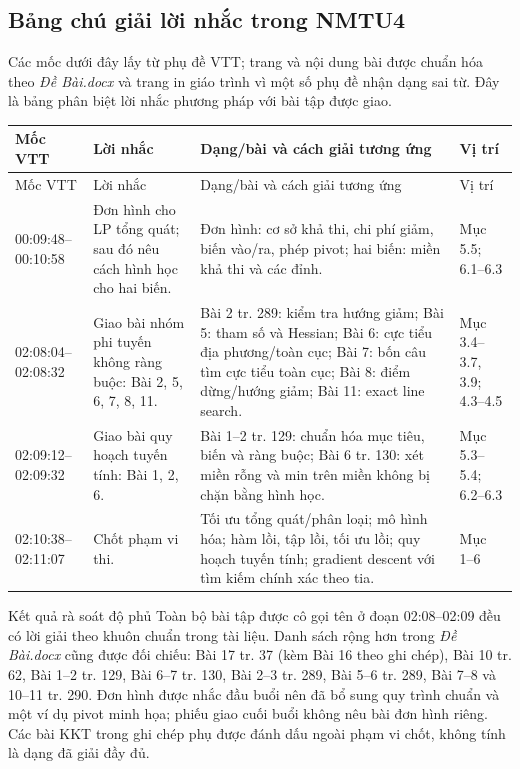 \documentclass[11pt,a4paper]{article}
\begin{document}
\subsection*{Bảng chú giải lời nhắc trong NMTU4}
Các mốc dưới đây lấy từ phụ đề VTT; trang và nội dung bài được chuẩn hóa theo \textit{Đề Bài.docx} và trang in giáo trình vì một số phụ đề nhận dạng sai từ. Đây là bảng phân biệt lời nhắc phương pháp với bài tập được giao.
\begingroup
\small
\begin{longtable}{p{} p{} p{} p{}}
\toprule
Mốc VTT & Lời nhắc & Dạng/bài và cách giải tương ứng & Vị trí\\
\midrule
\endfirsthead
\toprule
Mốc VTT & Lời nhắc & Dạng/bài và cách giải tương ứng & Vị trí\\
\midrule
\endhead
00:09:48--00:10:58 & Đơn hình cho LP tổng quát; sau đó nêu cách hình học cho hai biến. & Đơn hình: cơ sở khả thi, chi phí giảm, biến vào/ra, phép pivot; hai biến: miền khả thi và các đỉnh. & Mục 5.5; 6.1--6.3\\
02:08:04--02:08:32 & Giao bài nhóm phi tuyến không ràng buộc: Bài 2, 5, 6, 7, 8, 11. & Bài 2 tr. 289: kiểm tra hướng giảm; Bài 5: tham số và Hessian; Bài 6: cực tiểu địa phương/toàn cục; Bài 7: bốn câu tìm cực tiểu toàn cục; Bài 8: điểm dừng/hướng giảm; Bài 11: exact line search. & Mục 3.4--3.7, 3.9; 4.3--4.5\\
02:09:12--02:09:32 & Giao bài quy hoạch tuyến tính: Bài 1, 2, 6. & Bài 1--2 tr. 129: chuẩn hóa mục tiêu, biến và ràng buộc; Bài 6 tr. 130: xét miền rỗng và min trên miền không bị chặn bằng hình học. & Mục 5.3--5.4; 6.2--6.3\\
02:10:38--02:11:07 & Chốt phạm vi thi. & Tối ưu tổng quát/phân loại; mô hình hóa; hàm lồi, tập lồi, tối ưu lồi; quy hoạch tuyến tính; gradient descent với tìm kiếm chính xác theo tia. & Mục 1--6\\
\bottomrule
\end{longtable}
\endgroup

\begin{answerbox}{Kết quả rà soát độ phủ}
Toàn bộ bài tập được cô gọi tên ở đoạn 02:08--02:09 đều có lời giải theo khuôn chuẩn trong tài liệu. Danh sách rộng hơn trong \textit{Đề Bài.docx} cũng được đối chiếu: Bài 17 tr. 37 (kèm Bài 16 theo ghi chép), Bài 10 tr. 62, Bài 1--2 tr. 129, Bài 6--7 tr. 130, Bài 2--3 tr. 289, Bài 5--6 tr. 289, Bài 7--8 và 10--11 tr. 290. Đơn hình được nhắc đầu buổi nên đã bổ sung quy trình chuẩn và một ví dụ pivot minh họa; phiếu giao cuối buổi không nêu bài đơn hình riêng. Các bài KKT trong ghi chép phụ được đánh dấu ngoài phạm vi chốt, không tính là dạng đã giải đầy đủ.
\end{answerbox}
\end{document}
